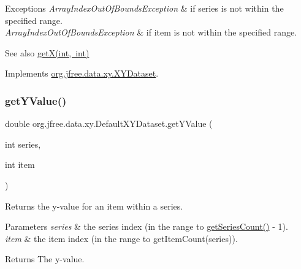 \begin{DoxyExceptions}{Exceptions}
{\em Array\+Index\+Out\+Of\+Bounds\+Exception} & if {\ttfamily series} is not within the specified range. \\
\hline
{\em Array\+Index\+Out\+Of\+Bounds\+Exception} & if {\ttfamily item} is not within the specified range.\\
\hline
\end{DoxyExceptions}
\begin{DoxySeeAlso}{See also}
\mbox{\hyperlink{classorg_1_1jfree_1_1data_1_1xy_1_1_default_x_y_dataset_ab501c39779d3289533248c8c40a18c1d}{get\+X(int, int)}} 
\end{DoxySeeAlso}


Implements \mbox{\hyperlink{interfaceorg_1_1jfree_1_1data_1_1xy_1_1_x_y_dataset_aa915867221e0f94021bad3140db5254e}{org.\+jfree.\+data.\+xy.\+X\+Y\+Dataset}}.

\mbox{\label{classorg_1_1jfree_1_1data_1_1xy_1_1_default_x_y_dataset_a2ac3a1e3295eaa3aacb36b210926fbf4}} 
\subsubsection{\texorpdfstring{get\+Y\+Value()}{getYValue()}}
{\footnotesize\ttfamily double org.\+jfree.\+data.\+xy.\+Default\+X\+Y\+Dataset.\+get\+Y\+Value (\begin{DoxyParamCaption}\item[{int}]{series,  }\item[{int}]{item }\end{DoxyParamCaption})}

Returns the y-\/value for an item within a series.


\begin{DoxyParams}{Parameters}
{\em series} & the series index (in the range {} to {\ttfamily \mbox{\hyperlink{classorg_1_1jfree_1_1data_1_1xy_1_1_default_x_y_dataset_a0e11a4936eb729adf611cb44013abc5b}{get\+Series\+Count()}} -\/ 1}). \\
\hline
{\em item} & the item index (in the range {} to {\ttfamily get\+Item\+Count(series)}).\\
\hline
\end{DoxyParams}
\begin{DoxyReturn}{Returns}
The y-\/value.
\end{DoxyReturn}

